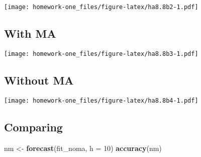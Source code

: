 \documentclass[openany]{book}
\newenvironment{Shaded}{\begin{snugshade}}{\end{snugshade}}
\newcommand{\DataTypeTok}[1]{\textcolor[rgb]{0.13,0.29,0.53}{#1}}
\newcommand{\DecValTok}[1]{\textcolor[rgb]{0.00,0.00,0.81}{#1}}
\newcommand{\KeywordTok}[1]{\textcolor[rgb]{0.13,0.29,0.53}{\textbf{#1}}}
\newcommand{\NormalTok}[1]{#1}
\newcommand{\OperatorTok}[1]{\textcolor[rgb]{0.81,0.36,0.00}{\textbf{#1}}}
\newcommand{\StringTok}[1]{\textcolor[rgb]{0.31,0.60,0.02}{#1}}
\begin{document}
\texttt{[image: homework-one\_files/figure-latex/ha8.8b2-1.pdf]}

\hypertarget{with-ma}{%
\subsection{With MA}\label{with-ma}}

\begin{Shaded}
\end{Shaded}

\texttt{[image: homework-one\_files/figure-latex/ha8.8b3-1.pdf]}

\hypertarget{without-ma}{%
\subsection{Without MA}\label{without-ma}}

\begin{Shaded}
\end{Shaded}

\texttt{[image: homework-one\_files/figure-latex/ha8.8b4-1.pdf]}

\hypertarget{comparing}{%
\subsection{Comparing}\label{comparing}}

\begin{Shaded}
\begin{Highlighting}[]
\NormalTok{nm <-}\StringTok{ }\KeywordTok{forecast}\NormalTok{(fit_noma, }\DataTypeTok{h =} \DecValTok{10}\NormalTok{)}
\KeywordTok{accuracy}\NormalTok{(nm)}
\end{Highlighting}
\end{Shaded}
\end{document}
